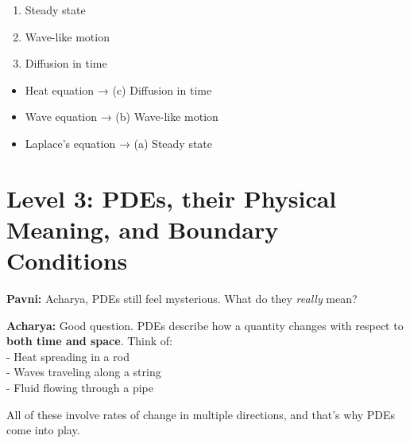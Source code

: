\documentclass[
  letterpaper,
]{book}
\providecommand{\tightlist}{%
  \setlength{\itemsep}{0pt}\setlength{\parskip}{0pt}}
\begin{document}
\begin{enumerate}
\def\labelenumi{(\alph{enumi})}
\tightlist
\item
  Steady state\\
\item
  Wave-like motion\\
\item
  Diffusion in time
\end{enumerate}

\begin{tcolorbox}[enhanced jigsaw, toprule=.15mm, opacityback=0, rightrule=.15mm, breakable, colframe=quarto-callout-tip-color-frame, coltitle=black, toptitle=1mm, titlerule=0mm, left=2mm, bottomrule=.15mm, leftrule=.75mm, colback=white, colbacktitle=quarto-callout-tip-color!10!white, bottomtitle=1mm, opacitybacktitle=0.6, title=\textcolor{quarto-callout-tip-color}{\faLightbulb}\hspace{0.5em}{Answer 5}, arc=.35mm]

\begin{itemize}
\tightlist
\item
  Heat equation → (c) Diffusion in time\\
\item
  Wave equation → (b) Wave-like motion\\
\item
  Laplace's equation → (a) Steady state\\
\end{itemize}

\end{tcolorbox}


\chapter{Level 3: PDEs, their Physical Meaning, and Boundary
Conditions}\label{level-3-pdes-their-physical-meaning-and-boundary-conditions}

\textbf{Pavni:} Acharya, PDEs still feel mysterious. What do they
\emph{really} mean?

\textbf{Acharya:} Good question. PDEs describe how a quantity changes
with respect to \textbf{both time and space}. Think of:\\
- Heat spreading in a rod\\
- Waves traveling along a string\\
- Fluid flowing through a pipe

All of these involve rates of change in multiple directions, and that's
why PDEs come into play.
\end{document}
